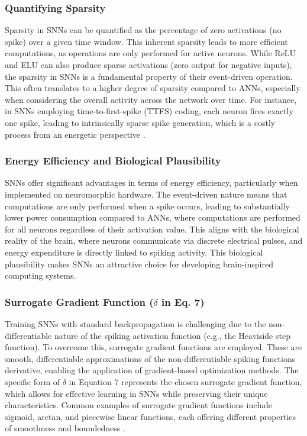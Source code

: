 \documentclass[pdflatex,sn-mathphys-num]{sn-jnl}
\theoremstyle{thmstyleone}%
\theoremstyle{thmstyletwo}%
\theoremstyle{thmstylethree}%
\begin{document}
\subsubsection{Quantifying Sparsity}

Sparsity in SNNs can be quantified as the percentage of zero activations (no spike) over a given time window. This inherent sparsity leads to more efficient computations, as operations are only performed for active neurons. While ReLU and ELU can also produce sparse activations (zero output for negative inputs), the sparsity in SNNs is a fundamental property of their event-driven operation. This often translates to a higher degree of sparsity compared to ANNs, especially when considering the overall activity across the network over time. For instance, in SNNs employing time-to-first-spike (TTFS) coding, each neuron fires exactly one spike, leading to intrinsically sparse spike generation, which is a costly process from an energetic perspective \cite{stanojevic2024high}.

\subsubsection{Energy Efficiency and Biological Plausibility}

SNNs offer significant advantages in terms of energy efficiency, particularly when implemented on neuromorphic hardware. The event-driven nature means that computations are only performed when a spike occurs, leading to substantially lower power consumption compared to ANNs, where computations are performed for all neurons regardless of their activation value. This aligns with the biological reality of the brain, where neurons communicate via discrete electrical pulses, and energy expenditure is directly linked to spiking activity. This biological plausibility makes SNNs an attractive choice for developing brain-inspired computing systems.

\subsubsection{Surrogate Gradient Function ($\delta$ in Eq. 7)}

Training SNNs with standard backpropagation is challenging due to the non-differentiable nature of the spiking activation function (e.g., the Heaviside step function). To overcome this, surrogate gradient functions are employed. These are smooth, differentiable approximations of the non-differentiable spiking function\textquotesingle s derivative, enabling the application of gradient-based optimization methods. The specific form of $\delta$ in Equation 7 represents the chosen surrogate gradient function, which allows for effective learning in SNNs while preserving their unique characteristics. Common examples of surrogate gradient functions include sigmoid, arctan, and piecewise linear functions, each offering different properties of smoothness and boundedness \cite{he2023surrogate}.
\end{document}
